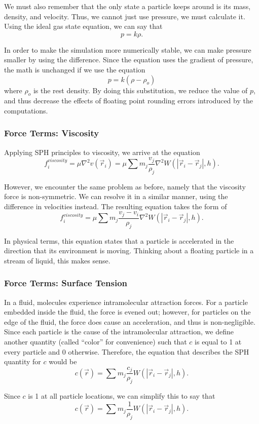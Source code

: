 \documentclass[a4paper]{article}
\begin{document}
We must also remember that the only state a particle keeps around is its mass, density, and velocity. Thus, we cannot just use pressure, we must calculate it. Using the ideal gas state equation, we can say that
\[p = k\rho.\]

In order to make the simulation more numerically stable, we can make pressure smaller by using the difference. Since the equation uses the gradient of pressure, the math is unchanged if we use the equation
\[p = k(\rho - \rho_o)\]
where $\rho_o$ is the rest density. By doing this substitution, we reduce the value of $p$, and thus decrease the effects of floating point rounding errors introduced by the computations.

\subsubsection*{Force Terms: Viscosity}
Applying SPH principles to viscosity, we arrive at the equation
\[f^{viscosity}_i = \mu\nabla^2 v(\vec r_i) = \mu \sum m_j \frac{v_j}{\rho_j} \nabla^2 W(|\vec r_i - \vec r_j|, h).\]

However, we encounter the same problem as before, namely that the viscosity force is non-symmetric. We can resolve it in a similar manner, using the difference in velocities instead. The resulting equation takes the form of
\[f^{viscosity}_i = \mu \sum m_j \frac{v_j-v_i}{\rho_j} \nabla^2 W(|\vec r_i - \vec r_j|, h).\]

In physical terms, this equation states that a particle is accelerated in the direction that its environment is moving. Thinking about a floating particle in a stream of liquid, this makes sense.

\subsubsection*{Force Terms: Surface Tension}
In a fluid, molecules experience intramolecular attraction forces. For a particle embedded inside the fluid, the force is evened out; however, for particles on the edge of the fluid, the force does cause an acceleration, and thus is non-negligible. Since each particle is the cause of the intramolecular attraction, we define another quantity (called ``color'' for convenience) such that $c$ is equal to 1 at every particle and 0 otherwise. Therefore, the equation that describes the SPH quantity for $c$ would be
\[c(\vec r) = \sum m_j \frac{c_j}{\rho_j} W(|\vec r_i - \vec r_j|, h).\]

Since $c$ is 1 at all particle locations, we can simplify this to say that
\[c(\vec r) = \sum m_j \frac{1}{\rho_j} W(|\vec r_i - \vec r_j|, h).\]
\end{document}
